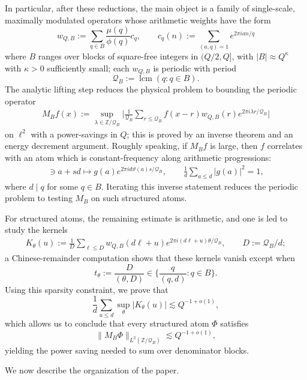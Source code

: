 \documentclass[12pt]{amsart}
\numberwithin{equation}{section}
\theoremstyle{definition}
\begin{document}
In particular, after these reductions, the main object is a family of single-scale, maximally
modulated operators whose arithmetic weights have the form
\[
    w_{Q,B}:=\sum_{q\in B}\frac{\mu(q)}{\phi(q)}c_q, \qquad c_q(n) := \sum_{(a,q) =1} e^{2 \pi i an/q}
\]
where \(B\) ranges over blocks of square-free integers in \((Q/2,Q]\), with
\(|B|\approx Q^\kappa\) with $\kappa > 0$ sufficiently small; each \(w_{Q,B}\) is periodic with period
\[
    \mathcal Q_B:=\operatorname{lcm}(q:q\in B).
\]
The analytic lifting step reduces the physical problem to bounding the periodic operator
\begin{align}
    M_Bf(x)
    :=
    \sup_{\lambda\in\mathbb Z/\mathcal Q_B}
    \bigg|
    \frac{1}{\mathcal Q_B}
    \sum_{r\leq\mathcal Q_B}
    f(x-r)w_{Q,B}(r)e^{2\pi i\lambda r/\mathcal{Q}_B}
    \bigg|
\end{align}
on $\ell^2$ with a power-savings in $Q$; this is proved by an inverse theorem and an energy decrement argument.  Roughly speaking, if \(M_Bf\) is large, then \(f\) correlates with an atom
which is constant-frequency along arithmetic progressions:
\begin{align}
    [\mathcal Q_B]\ni a+sd
    \longmapsto
    g(a)e^{2\pi i d\vartheta(a)s/\mathcal Q_B},
    \qquad
    \frac1d\sum_{a\leq d}|g(a)|^2=1,
\end{align}
where \(d\mid q\) for some \(q\in B\).  Iterating this inverse statement reduces the
periodic problem to testing \(M_B\) on such structured atoms.

For structured atoms, the remaining estimate is arithmetic, and one is led to study the kernels
\begin{align}
    K_\theta(u)
    :=
    \frac1D
    \sum_{\ell\leq D}
    w_{Q,B}(d\ell+u)
    e^{2\pi i(d\ell+u)\theta/\mathcal Q_B},
    \qquad
    D:=\mathcal Q_B/d;
\end{align}
a Chinese-remainder computation shows that these kernels vanish except when
\[
    t_\theta:=\frac{D}{(\theta,D)}
    \in
    \bigg\{\frac{q}{(q,d)}:q\in B\bigg\}.
\]
Using this sparsity constraint, we prove that 
\[
    \frac{1}{d} \sum_{u \leq d} \sup_\theta |K_\theta(u)| \lesssim Q^{-1+o(1)},
\]
which allows us to conclude that every structured atom \(\Phi\) satisfies
\[
    \|M_B\Phi\|_{L^2(\mathbb Z/\mathcal Q_B)}
    \lesssim Q^{-1+o(1)},
\]
yielding the power saving needed to sum over denominator blocks.




\medskip

We now describe the organization of the paper.
\end{document}
